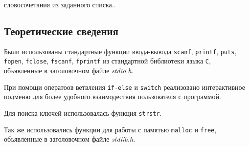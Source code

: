 \documentclass[12pt,a4paper]{report}
\begin{document}
словосочетания из заданного списка..

\subsection{Теоретические сведения}
\hspace{\parindent}\hspace{\parindent}Были использованы стандартные функции ввода-вывода \texttt{scanf}, \texttt{printf}, \texttt{puts}, \texttt{fopen}, \texttt{fclose}, \texttt{fscanf}, \texttt{fprintf} из стандартной библиотеки языка \verb+С+, объявленные в заголовочном файле \textit{stdio.h}.

При помощи оператоов ветвления \texttt{if-else} и \texttt{switch} реализовано интерактивное подменю для более удобного взаимодествия пользователя с программой.

Для поиска ключей использовалась функция \verb+strstr+.

Так же использовались функции для работы с памятью \verb+malloc+ и \verb+free+, объявленные в заголовочном файле \textit{stdlib.h}.
\end{document}
